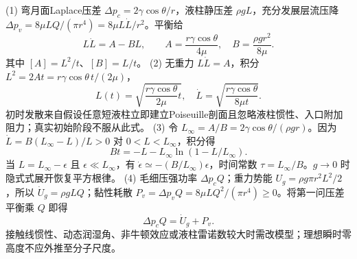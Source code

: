 (1) 弯月面Laplace压差 \(\Delta p_c=2\gamma\cos\theta/r\)，液柱静压差 \(\rho gL\)，充分发展层流压降 \(\Delta p_v=8\mu LQ/(\pi r^4)=8\mu L\dot L/r^2\)。平衡给
\[
L\dot L=A-BL,\qquad A=\frac{r\gamma\cos\theta}{4\mu},\quad B=\frac{\rho gr^2}{8\mu}.
\]
其中 \([A]=L^2/t\)、\([B]=L/t\)。
(2) 无重力 \(L\dot L=A\)，积分 \(L^2=2At=r\gamma\cos\theta\,t/(2\mu)\)，
\[
L(t)=\sqrt{\frac{r\gamma\cos\theta}{2\mu}t},\quad
\dot L=\sqrt{\frac{r\gamma\cos\theta}{8\mu t}}.
\]
初时发散来自假设任意短液柱立即建立Poiseuille剖面且忽略液柱惯性、入口附加阻力；真实初始阶段不服从此式。
(3) 令 \(L_\infty=A/B=2\gamma\cos\theta/(\rho gr)\)。因为 \(\dot L=B(L_\infty-L)/L>0\) 对 \(0<L<L_\infty\)，积分得
\[
Bt=-L-L_\infty\ln(1-L/L_\infty).
\]
当 \(L=L_\infty-\epsilon\) 且 \(\epsilon\ll L_\infty\)，有 \(\dot\epsilon\simeq-(B/L_\infty)\epsilon\)，时间常数 \(\tau=L_\infty/B\)。\(g\to0\) 时隐式式展开恢复平方根律。
(4) 毛细压强功率 \(\Delta p_cQ\)；重力势能 \(U_g=\rho g\pi r^2 L^2/2\)，所以 \(\dot U_g=\rho gLQ\)；黏性耗散 \(P_v=\Delta p_v Q=8\mu LQ^2/(\pi r^4)\ge0\)。将第一问压差平衡乘 \(Q\) 即得
\[
\Delta p_cQ=\dot U_g+P_v.
\]
接触线惯性、动态润湿角、非牛顿效应或液柱雷诺数较大时需改模型；理想瞬时零高度不应外推至分子尺度。
